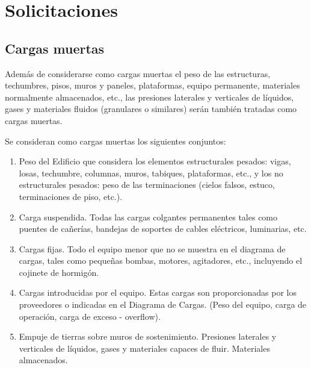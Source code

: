 \newpage
\section{Solicitaciones}

\subsection{Cargas muertas}

Además de considerarse como cargas muertas el peso de las estructuras, techumbres, pisos, muros y paneles, plataformas, equipo permanente, materiales normalmente almacenados, etc., las presiones laterales y verticales de líquidos, gases y materiales fluidos (granulares o similares) serán también tratadas como cargas muertas.
    
Se consideran como cargas muertas los siguientes conjuntos:

\begin{enumerate}[label=\alph*) ]
    \item Peso del Edificio que considera los elementos estructurales pesados: vigas, losas, techumbre, columnas, muros, tabiques, plataformas, etc., y los no estructurales pesados: peso de las terminaciones (cielos falsos, estuco, terminaciones de piso, etc.).
    
    \item Carga suspendida. Todas las cargas colgantes permanentes tales como puentes de cañerías, bandejas de soportes de cables eléctricos, luminarias, etc.

    \item Cargas fijas. Todo el equipo menor que no se muestra en el diagrama de cargas, tales como pequeñas bombas, motores, agitadores, etc., incluyendo el cojinete de hormigón.

    \item Cargas introducidas por el equipo. Estas cargas son proporcionadas por los proveedores o indicadas en el Diagrama de Cargas. (Peso del equipo, carga de operación, carga de exceso - overflow).

    \item Empuje de tierras sobre muros de sostenimiento. Presiones laterales y verticales de líquidos, gases y materiales capaces de fluir. Materiales almacenados.

\end{enumerate}

